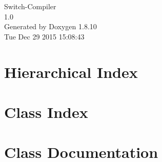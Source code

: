 \documentclass[twoside]{book}
\newcommand{\+}{\discretionary{\mbox{\scriptsize$\hookleftarrow$}}{}{}}
\newcommand{\clearemptydoublepage}{%
  \newpage{\pagestyle{empty}\cleardoublepage}%
}
\begin{document}
\hypersetup{pageanchor=false,
             bookmarks=true,
             bookmarksnumbered=true,
             pdfencoding=unicode
            }
\begin{titlepage}
\vspace*{7cm}
\begin{center}%
{\Large Switch-\/\+Compiler \\[1ex]\large 1.\+0 }\\
\vspace*{1cm}
{\large Generated by Doxygen 1.8.10}\\
\vspace*{0.5cm}
{\small Tue Dec 29 2015 15:08:43}\\
\end{center}
\end{titlepage}
\clearemptydoublepage
\tableofcontents
\clearemptydoublepage
{}
\hypersetup{pageanchor=true}

\chapter{Hierarchical Index}

\chapter{Class Index}

\chapter{Class Documentation}
















\backmatter
\newpage
{}
\clearemptydoublepage
{}
\printindex
\end{document}
